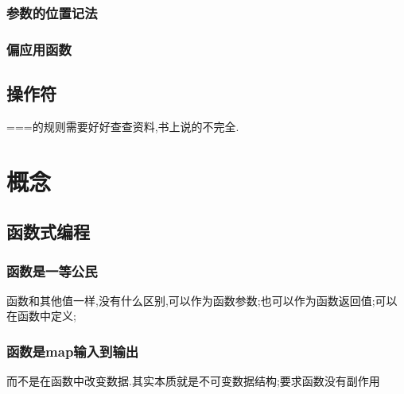 \subsubsection{参数的位置记法}

\subsubsection{偏应用函数}

\subsection{操作符}

===的规则需要好好查查资料,书上说的不完全.



\section{概念}

\subsection{函数式编程}

\subsubsection{函数是一等公民}

函数和其他值一样,没有什么区别,可以作为函数参数;也可以作为函数返回值;可以在函数中定义;

\subsubsection{函数是map输入到输出}

而不是在函数中改变数据.其实本质就是不可变数据结构;要求函数没有副作用


